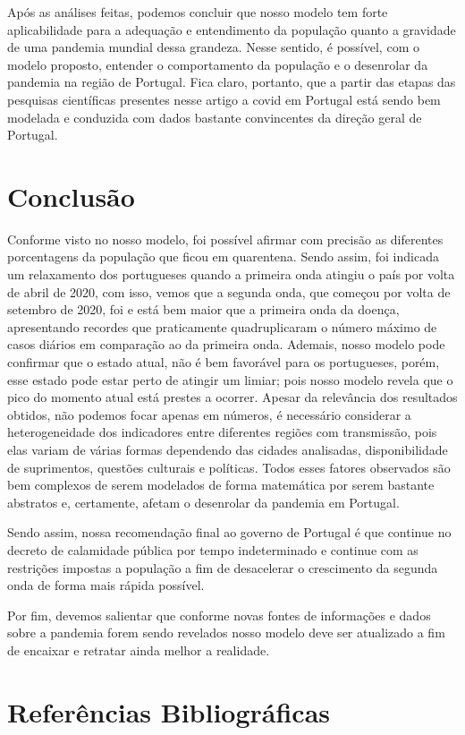\documentclass[12pt]{article}
\begin{document}
Após as análises feitas, podemos concluir que nosso modelo tem forte aplicabilidade para a adequação e entendimento da população quanto a gravidade de uma pandemia mundial dessa grandeza. Nesse sentido, é possível, com o modelo proposto, entender o comportamento da população e o desenrolar da pandemia na região de Portugal.
Fica claro, portanto, que a partir das etapas das pesquisas científicas presentes nesse artigo a covid em Portugal está sendo bem modelada e conduzida com dados bastante convincentes da direção geral de Portugal.


{\large \section{Conclusão} }

Conforme visto no nosso modelo, foi possível afirmar com precisão as diferentes porcentagens da população que ficou em quarentena. Sendo assim, foi indicada um relaxamento dos portugueses quando a primeira onda atingiu o país por volta de abril de 2020, com isso, vemos que a segunda onda, que começou por volta de setembro de 2020, foi e está bem maior que a primeira onda da doença, apresentando recordes que praticamente quadruplicaram o número máximo de casos diários em comparação ao da primeira onda.
\newline
\newline
Ademais, nosso modelo pode confirmar que o estado atual, não é bem favorável para os portugueses, porém, esse estado pode estar perto de atingir um limiar; pois nosso modelo revela que o pico do momento atual está prestes a ocorrer.
Apesar da relevância dos resultados obtidos, não podemos focar apenas em números, é necessário considerar a heterogeneidade dos indicadores entre diferentes regiões com transmissão, pois elas variam de várias formas dependendo das cidades analisadas, disponibilidade de suprimentos, questões culturais e políticas. Todos esses fatores observados são bem complexos de serem modelados de forma matemática por serem bastante abstratos e, certamente, afetam o desenrolar da pandemia em Portugal.
\newline

Sendo assim, nossa recomendação final ao governo de Portugal é que continue no decreto de calamidade pública por tempo indeterminado e continue com as restrições impostas a população a fim de desacelerar o crescimento da segunda onda de forma mais rápida possível. 
\newline

Por fim, devemos salientar que conforme novas fontes de informações e dados sobre a pandemia forem sendo revelados nosso modelo deve ser atualizado a fim de encaixar e retratar ainda melhor a realidade.

{\large \section{Referências Bibliográficas}}

\end{document}
